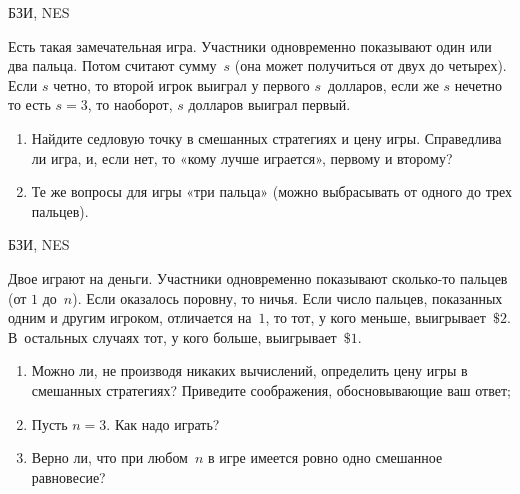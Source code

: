 \begin{problem}
\begin{source}
БЗИ, NES
\end{source}
 Есть такая замечательная игра.
Участники одновременно показывают один или два пальца.
Потом считают сумму~$s$ (она может получиться от двух до
четырех). Если $s$ четно, то второй игрок выиграл у первого
$s$~долларов, если же $s$ нечетно то есть $s=3$, то наоборот, $s$ долларов выиграл
первый.

\begin{enumerate}

\item Найдите седловую точку в смешанных стратегиях и цену
игры. Справедлива ли игра, и, если нет, то «кому лучше играется», первому и второму?

\item Те же вопросы для игры «три пальца» (можно
выбрасывать от одного до трех пальцев).

\end{enumerate}



\begin{sol}

\end{sol}
\end{problem}




\begin{problem}
\begin{source}
БЗИ, NES
\end{source} Двое играют на
деньги. Участники одновременно показывают сколько-то
пальцев (от $1$ до~$n$). Если оказалось поровну, то ничья.
Если число пальцев, показанных одним и другим игроком,
отличается на~$1$, то тот, у кого меньше, выигрывает~$\$2$.
В~остальных случаях тот, у кого больше, выигрывает~$\$1$.

\begin{enumerate}

\item Можно ли, не производя никаких вычислений, определить
цену игры в смешанных стратегиях? Приведите соображения,
обосновывающие ваш ответ;

\item Пусть $n=3$. Как надо играть?

\item Верно ли, что при любом~$n$ в игре имеется ровно одно
смешанное равновесие?

\end{enumerate}

\begin{sol}

\end{sol}
\end{problem}





